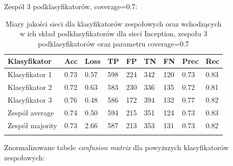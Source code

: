 \documentclass[polish,12pt]{aghthesis}
\begin{document}
\noindent Zespół 3 podklasyfikatorów, coverage=0.7:
\renewcommand{\arraystretch}{1.75}
 \begin{longtable}[h!]{|m{2.6cm}|m{1.2cm}|m{1.2cm}|m{1.2cm}|m{1.2cm}|m{1.2cm}|m{1.2cm}|m{1.2cm}|m{1.2cm}|}
 \hline
 Klasyfikator & Acc & Loss & TP & FP & TN & FN & Prec & Rec\\
 \hline
 Klasyfikator 1 & 0.73 & 0.57 & 598 & 224 & 342 & 120 & 0.73 & 0.83\\
 \hline
 Klasyfikator 2 & 0.72 & 0.63 & 583 & 230 & 336 & 135 & 0.72 & 0.81\\
 \hline
 Klasyfikator 3 & 0.76 & 0.48 & 586 & 172 & 394 & 132 & 0.77 & 0.82\\
 \hline
 Zespół average & 0.74 & 0.50 & 594 & 215 & 351 & 124 & 0.73 & 0.83\\ 
 \hline
 Zespół \newline majority & 0.73 & 2.66 & 587 & 213 & 353 & 131 & 0.73 & 0.82\\
 \hline
\caption{Miary jakości sieci dla klasyfikatorów zespołowych oraz wchodzących w ich skład podklasyfikatorów dla sieci Inception, zespołu 3 podklasyfikatorów oraz parametru coverage=0.7}
\label{table:25}
\end{longtable}
\newpage
\noindent Znormalizowane tabele \textit{confusion matrix} dla powyższych klasyfikatorów zespołowych:
\end{document}
